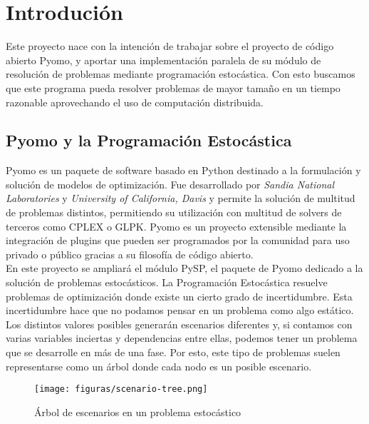 \chapter{Introdución}

Este proyecto nace con la intención de trabajar sobre el proyecto de código abierto Pyomo, y aportar una implementación paralela de su módulo de resolución de problemas mediante programación estocástica. Con esto buscamos que este programa pueda resolver problemas de mayor tamaño en un tiempo razonable aprovechando el uso de computación distribuida.

\section{Pyomo y la Programación Estocástica}


Pyomo \cite{pyomo} es un paquete de software basado en Python destinado a la formulación y solución de modelos de optimización. Fue desarrollado por \textit{Sandia National Laboratories} y \textit{University of California, Davis} y permite la solución de multitud de problemas distintos, permitiendo su utilización con multitud de solvers de terceros como CPLEX o GLPK. Pyomo es un proyecto extensible mediante la integración de plugins que pueden ser programados por la comunidad para uso privado o público gracias a su filosofía de código abierto.\\

En este proyecto se ampliará el módulo PySP, el paquete de Pyomo dedicado a la solución de problemas estocásticos. La Programación Estocástica \cite{stochasticProgramming} resuelve problemas de optimización donde existe un cierto grado de incertidumbre. Esta incertidumbre hace que no podamos pensar en un problema como algo estático. Los distintos valores posibles generarán escenarios diferentes y, si contamos con varias variables inciertas y dependencias entre ellas, podemos tener un problema que se desarrolle en más de una fase. Por esto, este tipo de problemas suelen representarse como un árbol donde cada nodo es un posible escenario.\\

\begin{figure}[H]
    \centerline{\texttt{[image: figuras/scenario-tree.png]}}
    \caption{Árbol de escenarios en un problema estocástico}
\end{figure}

